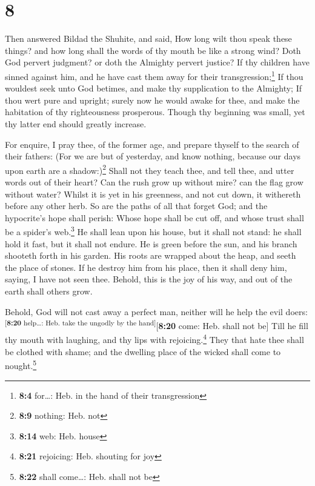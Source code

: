 \hypertarget{section-7}{%
\section{8}\label{section-7}}

 Then answered Bildad the Shuhite, and said,
 How long wilt thou speak these things? and how long shall
the words of thy mouth be like a strong wind?  Doth God
pervert judgment? or doth the Almighty pervert justice? 
If thy children have sinned against him, and he have cast them away for
their transgression;\footnote{\textbf{8:4} for\ldots: Heb. in the hand
  of their transgression}  If thou wouldest seek unto God
betimes, and make thy supplication to the Almighty;  If
thou wert pure and upright; surely now he would awake for thee, and make
the habitation of thy righteousness prosperous.  Though
thy beginning was small, yet thy latter end should greatly increase.

 For enquire, I pray thee, of the former age, and prepare
thyself to the search of their fathers:  (For we are but
of yesterday, and know nothing, because our days upon earth are a
shadow:)\footnote{\textbf{8:9} nothing: Heb. not}  Shall
not they teach thee, and tell thee, and utter words out of their heart?
 Can the rush grow up without mire? can the flag grow
without water?  Whilst it is yet in his greenness, and
not cut down, it withereth before any other herb.  So are
the paths of all that forget God; and the hypocrite's hope shall perish:
 Whose hope shall be cut off, and whose trust shall be a
spider's web.\footnote{\textbf{8:14} web: Heb. house}  He
shall lean upon his house, but it shall not stand: he shall hold it
fast, but it shall not endure.  He is green before the
sun, and his branch shooteth forth in his garden.  His
roots are wrapped about the heap, and seeth the place of stones.
 If he destroy him from his place, then it shall deny
him, saying, I have not seen thee.  Behold, this is the
joy of his way, and out of the earth shall others grow.

 Behold, God will not cast away a perfect man, neither
will he help the evil doers:\textsuperscript{{[}\textbf{8:20}
help\ldots: Heb. take the ungodly by the hand{]}}{[}\textbf{8:20} come:
Heb. shall not be{]}  Till he fill thy mouth with
laughing, and thy lips with rejoicing.\footnote{\textbf{8:21} rejoicing:
  Heb. shouting for joy}  They that hate thee shall be
clothed with shame; and the dwelling place of the wicked shall come to
nought.\footnote{\textbf{8:22} shall come\ldots: Heb. shall not be}


